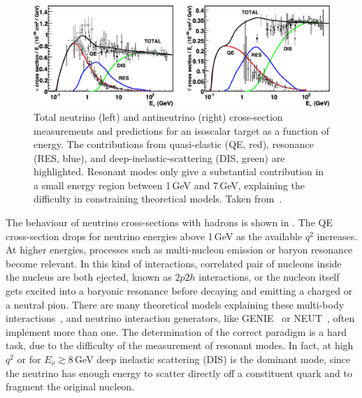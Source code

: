 \begin{figure}
	\centering
	\includegraphics[width=\textwidth]{pics/qe_xsec.pdf}
	\caption[Neutrino--nucleus cross-sections at high neutrino energies]%
	{Total neutrino (left) and antineutrino (right) cross-section measurements and predictions for an isoscalar target %
	as a function of energy. The contributions from quasi-elastic (QE, red), resonance (RES, blue), %
	and deep-inelastic-scattering (DIS, green) are highlighted.
	Resonant modes only give a substantial contribution in a small energy region between 1\,GeV and 7\,GeV, %
	explaining the difficulty in constraining theoretical models.
	Taken from~.}
	\label{fig:xsec}
\end{figure}

The behaviour of neutrino cross-sections with hadrons is shown in .
The QE cross-section drops for neutrino energies above 1\,GeV as the available $q^2$ increases. 
At higher energies, processes such as multi-nucleon emission or baryon resonance become relevant.
In this kind of interactions, correlated pair of nucleons inside the nucleus are both ejected, known as $2p2h$ interactions, %
or the nucleon itself gets excited into a baryonic resonance before decaying and emitting a charged or a neutral pion.
There are many theoretical models explaining these multi-body interactions~\cite{Rein:1980wg, Martini:2009uj, Nieves:2011pp}, %
and neutrino interaction generators, like GENIE~\cite{Andreopoulos:2009rq} or NEUT~\cite{Hayato:2002sd}, %
often implement more than one.
The determination of the correct paradigm is a hard task, due to the difficulty of the measurement of resonant modes.
In fact, at high $q^2$ or for $E_\nu \gtrsim 8$\,GeV deep inelastic scattering (DIS) is the dominant mode, since %
the neutrino has enough energy to scatter directly off a constituent quark and to fragment the original nucleon.
